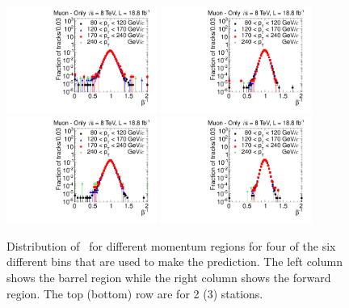 \begin{figure}
\begin{center}
\includegraphics[clip=true, trim=0.0cm 0cm 3.0cm 0cm,width=0.44\textwidth]{figures/muonly/Control_Data8TeV_Pt_TOFSpectrum_Binned_0}
\includegraphics[clip=true, trim=0.0cm 0cm 3.0cm 0cm,width=0.44\textwidth]{figures/muonly/Control_Data8TeV_Pt_TOFSpectrum_Binned_3} \\
\includegraphics[clip=true, trim=0.0cm 0cm 3.0cm 0cm,width=0.44\textwidth]{figures/muonly/Control_Data8TeV_Pt_TOFSpectrum_Binned_1}
\includegraphics[clip=true, trim=0.0cm 0cm 3.0cm 0cm,width=0.44\textwidth]{figures/muonly/Control_Data8TeV_Pt_TOFSpectrum_Binned_4}
\caption[Distribution of \invbeta\
for different momentum regions for two and three station tracks in the \muononly\ analysis.]
{Distribution of \invbeta\ 
for different momentum regions for four of the six different bins that are used to make the prediction.
The left column shows the barrel region while the right column
shows the forward region.  The top (bottom) row are for 2 (3) stations.}
\label{fig:MuOnlyControl}
\end{center}
\end{figure}

